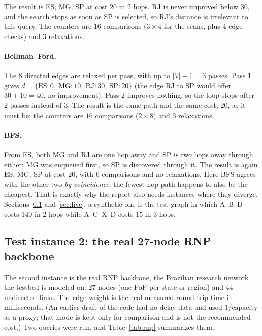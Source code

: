 \documentclass[11pt,a4paper]{article}
\begin{document}
The result is ES, MG, SP at cost $20$ in $2$ hops. RJ is never improved below $30$, and the search stops
as soon as SP is selected, so RJ's distance is irrelevant to this query. The counters are $16$ comparisons
($3\times 4$ for the scans, plus $4$ edge checks) and $3$ relaxations.

\paragraph{Bellman--Ford.} The $8$ directed edges are relaxed per pass, with up to $|V|-1=3$ passes. Pass 1
gives $d=\{\text{ES}:0,\ \text{MG}:10,\ \text{RJ}:30,\ \text{SP}:20\}$ (the edge RJ to SP would offer $30+10=40$,
no improvement). Pass 2 improves nothing, so the loop stops after $2$ passes instead of $3$. The result is the
same path and the same cost, $20$, as it must be; the counters are $16$ comparisons ($2\times 8$) and $3$ relaxations.

\paragraph{BFS.} From ES, both MG and RJ are one hop away and SP is two hops away through either; MG was enqueued
first, so SP is discovered through it. The result is again ES, MG, SP at cost $20$, with $6$ comparisons and no relaxations.
Here BFS agrees with the other two \emph{by coincidence}: the fewest-hop path happens to also be the cheapest. That is exactly why
the report also needs instances where they diverge, Sections~\ref{sec:rnp} and \ref{sec:live}; a synthetic one is the
test graph in which A--B--D costs $140$ in $2$ hops while A--C--X--D costs $15$ in $3$ hops.

\subsection{Test instance 2: the real 27-node RNP backbone}
\label{sec:rnp}

The second instance is the real RNP backbone, the Brazilian research network the testbed is modeled on:
$27$ nodes (one PoP per state or region) and $44$ undirected links. The edge weight is the real measured
round-trip time in milliseconds. (An earlier draft of the code had no delay data and used $1/\text{capacity}$ as
a proxy; that mode is kept only for comparison and is not the recommended cost.) Two queries were run, and
Table~\ref{tab:rnp} summarizes them.
\end{document}
